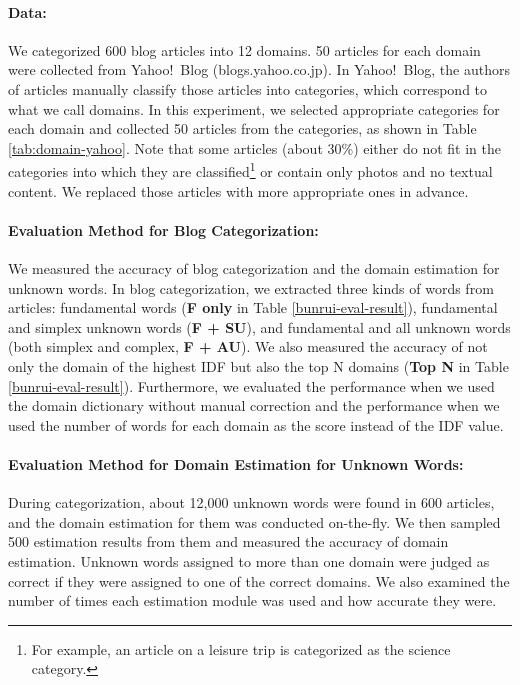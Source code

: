 \documentclass[english]{jnlp_1.4_rep}
\begin{document}
\paragraph{Data: }
We categorized 600 blog articles into 12 domains.
50 articles for each domain were collected from Yahoo!~Blog
(blogs.yahoo.co.jp).
In Yahoo!~Blog,
the authors of articles manually classify those articles into
categories, which correspond to what we call domains.
In this experiment, we selected appropriate categories for each domain
and collected 50 articles from the categories, as shown in
Table \ref{tab:domain-yahoo}.
Note that 
some articles (about 30\%) either do not fit in the categories 
into which they are classified\footnote{
For example, an article on a leisure trip is categorized as 
the science category.
} or contain only photos and no textual content.
We replaced those articles with more appropriate ones in advance.


\paragraph{Evaluation Method for Blog Categorization: }
We measured the accuracy of blog categorization and the domain
estimation for unknown words.
In blog categorization, we extracted three kinds of words 
from articles:
fundamental words (\textbf{F only} in Table \ref{bunrui-eval-result}),
fundamental and simplex unknown words
(\textbf{F + SU}), and
fundamental and all unknown words (both simplex and
complex, \textbf{F + AU}). 
We also measured the accuracy of not only the domain of the highest IDF
but also the top N domains (\textbf{Top N} in Table
\ref{bunrui-eval-result}).
Furthermore, we evaluated the performance when we used the domain
dictionary without manual correction and the performance when we used
the number of words for each domain as the score instead of the IDF
value. 

\paragraph{Evaluation Method for Domain Estimation for Unknown Words: }
During categorization, about 12,000 unknown words were found in 
600 articles, and the domain estimation for them was conducted
on-the-fly.
We then sampled 500 estimation results from them and measured the
accuracy of domain estimation.
Unknown words assigned to more than one domain were judged as correct
if they were assigned to one of the correct domains.
We also examined the number of times each estimation module was used and
how accurate they were.
\end{document}
